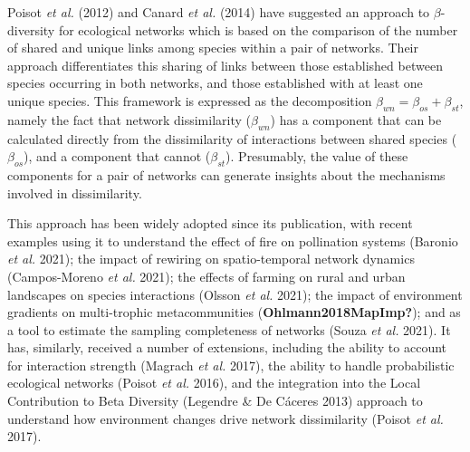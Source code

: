 \documentclass[11pt]{article}
\begin{document}
Poisot \emph{et al.} (2012) and Canard \emph{et al.} (2014) have
suggested an approach to \(\beta\)-diversity for ecological networks
which is based on the comparison of the number of shared and unique
links among species within a pair of networks. Their approach
differentiates this sharing of links between those established between
species occurring in both networks, and those established with at least
one unique species. This framework is expressed as the decomposition
\(\beta_{wn} = \beta_{os} + \beta_{st}\), namely the fact that network
dissimilarity (\(\beta_{wn}\)) has a component that can be calculated
directly from the dissimilarity of interactions between shared species
(\(\beta_{os}\)), and a component that cannot (\(\beta_{st}\)).
Presumably, the value of these components for a pair of networks can
generate insights about the mechanisms involved in dissimilarity.

This approach has been widely adopted since its publication, with recent
examples using it to understand the effect of fire on pollination
systems (Baronio \emph{et al.} 2021); the impact of rewiring on
spatio-temporal network dynamics (Campos-Moreno \emph{et al.} 2021); the
effects of farming on rural and urban landscapes on species interactions
(Olsson \emph{et al.} 2021); the impact of environment gradients on
multi-trophic metacommunities (\textbf{Ohlmann2018MapImp?}); and as a
tool to estimate the sampling completeness of networks (Souza \emph{et
al.} 2021). It has, similarly, received a number of extensions,
including the ability to account for interaction strength (Magrach
\emph{et al.} 2017), the ability to handle probabilistic ecological
networks (Poisot \emph{et al.} 2016), and the integration into the Local
Contribution to Beta Diversity (Legendre \& De Cáceres 2013) approach to
understand how environment changes drive network dissimilarity (Poisot
\emph{et al.} 2017).
\end{document}
